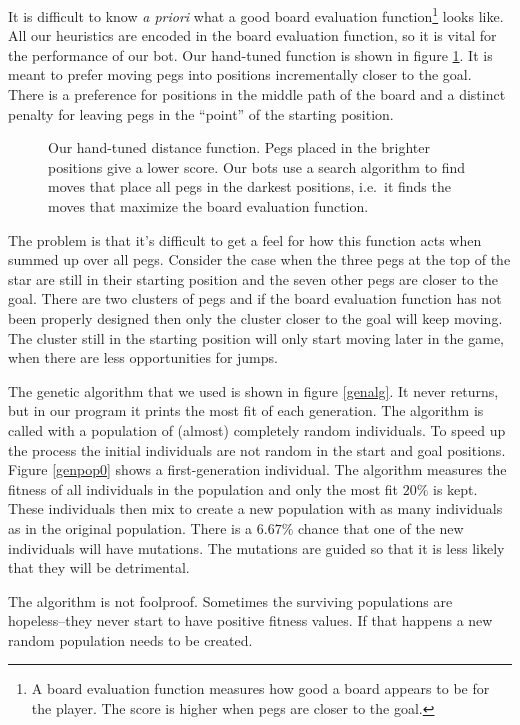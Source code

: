 \documentclass[a4paper,11pt]{article}
\begin{document}
It is difficult to know \emph{a priori} what a good board evaluation
function\footnote{A board evaluation function measures how good a
  board appears to be for the player. The score is higher when pegs
  are closer to the goal.} looks like. All our heuristics are encoded
in the board evaluation function, so it is vital for the performance
of our bot. Our hand-tuned function is shown in figure
\ref{handtuned}. It is meant to prefer moving pegs into positions
incrementally closer to the goal. There is a preference for positions
in the middle path of the board and a distinct penalty for leaving
pegs in the ``point'' of the starting position.

\begin{figure}
\centering

\caption{Our hand-tuned distance function. Pegs placed in the brighter
  positions give a lower score. Our bots use a search algorithm to
  find moves that place all pegs in the darkest positions, i.e.~it
  finds the moves that maximize the board evaluation function.}
\label{handtuned}
\end{figure}

The problem is that it's difficult to get a feel for how this function
acts when summed up over all pegs. Consider the case when the three
pegs at the top of the star are still in their starting position and
the seven other pegs are closer to the goal. There are two clusters of
pegs and if the board evaluation function has not been properly
designed then only the cluster closer to the goal will keep moving.
The cluster still in the starting position will only start moving
later in the game, when there are less opportunities for jumps.

The genetic algorithm that we used is shown in figure \ref{genalg}. It
never returns, but in our program it prints the most fit of each
generation. The algorithm is called with a population of (almost)
completely random individuals. To speed up the process the initial
individuals are not random in the start and goal positions. Figure
\ref{genpop0} shows a first-generation individual. The algorithm
measures the fitness of all individuals in the population and only the
most fit $20\%$ is kept. These individuals then mix to create a new
population with as many individuals as in the original population.
There is a $6.67\%$ chance that one of the new individuals will have
mutations. The mutations are guided so that it is less likely that
they will be detrimental.

The algorithm is not foolproof. Sometimes the surviving populations
are hopeless--they never start to have positive fitness values. If
that happens a new random population needs to be created.
\end{document}
